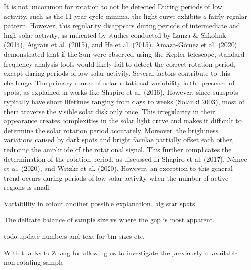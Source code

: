 It is not uncommon for rotation to not be detected
During periods of low activity, such as the 11-year cycle minima, the light curve exhibits a fairly regular pattern. 
However, this regularity disappears during periods of intermediate and high solar activity, as indicated by studies conducted by Lanza & Shkolnik (2014), Aigrain et al. (2015), and He et al. (2015).
Amazo-Gómez et al. (2020) demonstrated that if the Sun were observed using the Kepler telescope, standard frequency analysis tools would likely fail to detect the correct rotation period, except during periods of low solar activity. Several factors contribute to this challenge. The primary source of solar rotational variability is the presence of spots, as explained in works like Shapiro et al. (2016). However, since sunspots typically have short lifetimes ranging from days to weeks (Solanki 2003), most of them traverse the visible solar disk only once. This irregularity in their appearance creates complexities in the solar light curve and makes it difficult to determine the solar rotation period accurately.
Moreover, the brightness variations caused by dark spots and bright faculae partially offset each other, reducing the amplitude of the rotational signal. This further complicates the determination of the rotation period, as discussed in Shapiro et al. (2017), Nèmec et al. (2020), and Witzke et al. (2020). However, an exception to this general trend occurs during periods of low solar activity when the number of active regions is small. 


Variability in colour another possible explanation. big star spots


The delicate balance of sample size vs where the gap is most apparent.


todo:update numbers and text for bin sizes etc.





With thanks to Zhang for allowing us to investigate the previously unavailable non-rotating sample








